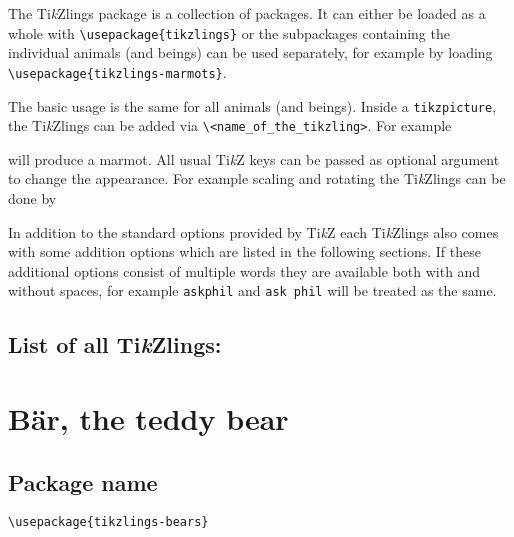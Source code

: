 \documentclass[parskip=half]{scrartcl}
\newcommand{\TikZ}{Ti\emph{k}Z\xspace}
\newcommand{\tikzlings}{Ti\emph{k}Zlings\xspace}
\begin{document}
The \tikzlings package is a collection of packages. It can either be loaded as a whole with \lstinline|\usepackage{tikzlings}| or the subpackages containing the individual animals (and beings) can be used separately, for example by loading \lstinline|\usepackage{tikzlings-marmots}|.

The basic usage is the same for all animals (and beings). Inside a \lstinline|tikzpicture|, the \tikzlings can be added via \color{SteelBlue!50!black}\lstinline|\<name_of_the_tikzling>|\color{black}. For example

\begin{tcblisting}{}
\marmot
\end{tcblisting}

will produce a marmot. All usual \TikZ keys can be passed as optional argument to change the appearance. For example scaling and rotating the \tikzlings can be done by

\begin{tcblisting}{}
\coati[rotate=30,scale=0.5]
\end{tcblisting}

In addition to the standard options provided by \TikZ each \tikzlings also comes with some addition options which are listed in the following sections. If these additional options consist of multiple words they are available both with and without spaces, for example \lstinline|askphil| and \lstinline|ask phil| will be treated as the same.

\subsection*{List of all \tikzlings:}

\begingroup
	\hypersetup{hidelinks}
	\tableofcontents
\endgroup


\clearpage
\section[Bear]{B\"ar, the teddy bear}

\subsection{Package name}

\begin{tcolorbox}[lower separated=false, lefthand width=.8\linewidth]
\vspace*{0.5cm}
\lstinline|\usepackage{tikzlings-bears}|
\vspace*{0.5cm}
\end{tcolorbox}
\end{document}
